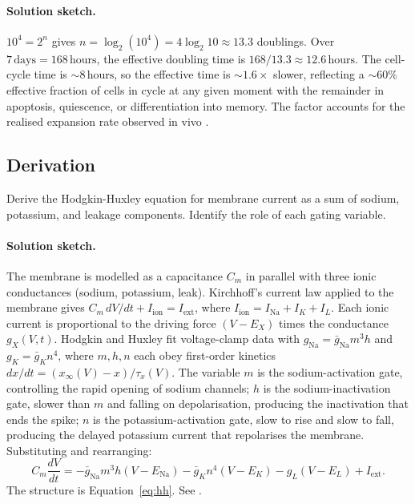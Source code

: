 \paragraph{Solution sketch.}
$10^4 = 2^n$ gives $n = \log_2(10^4) = 4 \log_2 10 \approx 13.3$
doublings. Over $7\,\text{days} = 168\,\text{hours}$, the effective
doubling time is $168/13.3 \approx 12.6\,\text{hours}$. The cell-
cycle time is $\sim 8\,\text{hours}$, so the effective time is
$\sim 1.6\times$ slower, reflecting a $\sim 60\%$ effective fraction
of cells in cycle at any given moment with the remainder in apoptosis,
quiescence, or differentiation into memory. The factor accounts for
the realised expansion rate observed in vivo \cite[ch.~11]{text:v6c07-janeway-immunobiology-2017}.

\subsection*{Derivation}

\begin{exercise}
Derive the Hodgkin-Huxley equation for membrane current as a sum of
sodium, potassium, and leakage components. Identify the role of each
gating variable.
\end{exercise}

\paragraph{Solution sketch.}
The membrane is modelled as a capacitance $C_m$ in parallel with three
ionic conductances (sodium, potassium, leak). Kirchhoff's current law
applied to the membrane gives
$C_m\,dV/dt + I_{\text{ion}} = I_{\text{ext}}$, where
$I_{\text{ion}} = I_{\text{Na}} + I_K + I_L$. Each ionic current is
proportional to the driving force $(V - E_X)$ times the conductance
$g_X(V,t)$. Hodgkin and Huxley fit voltage-clamp data with
$g_{\text{Na}} = \bar{g}_{\text{Na}} m^3 h$ and $g_K = \bar{g}_K n^4$,
where $m, h, n$ each obey first-order kinetics
$dx/dt = (x_\infty(V) - x)/\tau_x(V)$. The variable $m$ is the
sodium-activation gate, controlling the rapid opening of sodium
channels; $h$ is the sodium-inactivation gate, slower than $m$ and
falling on depolarisation, producing the inactivation that ends the
spike; $n$ is the potassium-activation gate, slow to rise and slow to
fall, producing the delayed potassium current that repolarises the
membrane. Substituting and rearranging:
\[
C_m \frac{dV}{dt} = -\bar{g}_{\text{Na}} m^3 h (V - E_{\text{Na}})
                    -\bar{g}_K n^4 (V - E_K)
                    - g_L (V - E_L) + I_{\text{ext}}.
\]
The structure is Equation~\ref{eq:hh}. See
\cite[p.~518--520]{paper:v6c07-hodgkin-huxley-1952}.

